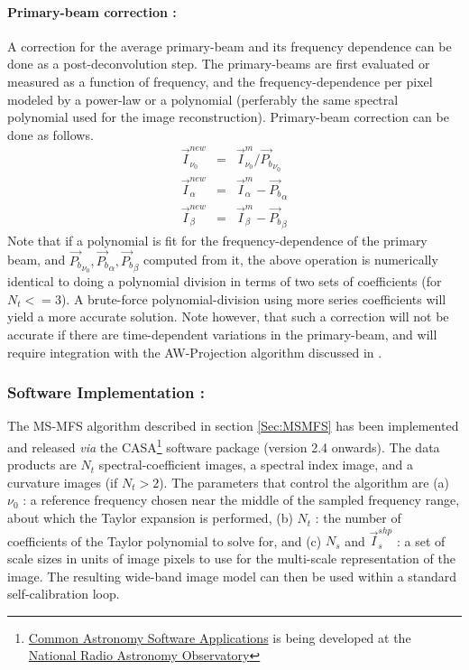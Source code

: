 \documentclass[structabstract]{stylefiles/aa}
\newcommand{\Pb}{{P_b}}
\newcommand{\I}{{\vec{I}}}
\begin{document}
\noindent \paragraph{\bf Primary-beam correction : } 
A correction for the average primary-beam and its frequency dependence can be
done as a post-deconvolution step. The primary-beams are first evaluated or measured 
as a function of frequency, and the frequency-dependence per pixel modeled by a
power-law or a polynomial (perferably the same spectral polynomial used for the image
reconstruction). Primary-beam correction can be done as follows.
\begin{eqnarray}
\vec{I}^{new}_{\nu_0}&=&\vec{I}^m_{\nu_0}/\vec{\Pb}_{\nu_0}\\
 \vec{I}^{new}_{\alpha}&=&\vec{I}^m_{\alpha}-\vec{\Pb}_{\alpha}\\
 \vec{I}^{new}_{\beta}&=&\vec{I}^m_{\beta}-\vec{\Pb}_{\beta}
\end{eqnarray}
Note that if a polynomial is fit for the frequency-dependence of the primary beam, 
and $\vec{\Pb}_{\nu_0}, \vec{\Pb}_{\alpha}, \vec{\Pb}_{\beta}$ computed from it, the above 
operation is numerically identical to doing a polynomial division in terms of two sets of
coefficients (for $N_t<=3$). A brute-force polynomial-division using more series coefficients
will yield a more accurate solution.   Note however, that such a correction will not be
accurate if there are time-dependent variations in the primary-beam, and will require
integration with the AW-Projection algorithm discussed in \citep{AW-Projection}.



\subsubsection{Software Implementation : }
The MS-MFS algorithm described in section \ref{Sec:MSMFS} has been implemented and 
released {\it via} the CASA\footnote{\href{http://casa.nrao.edu}
{Common Astronomy Software Applications} is being developed at the
\href{http://www.nrao.edu}{National Radio Astronomy Observatory}} 
software package (version 2.4 onwards). The data products are $N_t$
spectral-coefficient images, a spectral index image, and a curvature images (if $N_t>2$).
The parameters that control the algorithm are (a) $\nu_0$ : a reference frequency chosen near the middle of the sampled
frequency range, about which the Taylor expansion is performed, 
(b) $N_t$ : the number of coefficients of the Taylor polynomial to solve for, and 
(c) $N_s$ and $\I^{shp}_s$ : a set of scale sizes in units of image pixels to use
for the multi-scale representation of the image.
The resulting wide-band image model can then be used within a standard 
self-calibration loop. 
\end{document}
